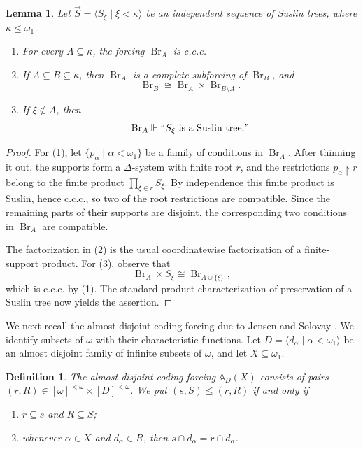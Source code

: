 \documentclass[a4paper,11pt]{article}
\newtheorem{lemma}[theorem]{Lemma}
\newtheorem{definition}[theorem]{Definition}
\begin{document}
\begin{lemma}\label{finite-support-branch-products}
Let $\vec S=\langle S_\xi\mid\xi<\kappa\rangle$ be an independent sequence of
Suslin trees, where $\kappa\leq\omega_1$.
\begin{enumerate}
\item For every $A\subseteq\kappa$, the forcing $\operatorname{Br}_A$ is c.c.c.
\item If $A\subseteq B\subseteq\kappa$, then $\operatorname{Br}_A$ is a
      complete subforcing of $\operatorname{Br}_B$, and
      \[
         \operatorname{Br}_B\cong
         \operatorname{Br}_A\times\operatorname{Br}_{B\setminus A}.
      \]
\item If $\xi\notin A$, then
      \[
         \operatorname{Br}_A\Vdash ``S_\xi\text{ is a Suslin tree}."
      \]
\end{enumerate}
\end{lemma}

\begin{proof}
For (1), let $\{p_\alpha\mid\alpha<\omega_1\}$ be a family of conditions in
$\operatorname{Br}_A$.  After thinning it out, the supports form a
$\Delta$-system with finite root $r$, and the restrictions
$p_\alpha\upharpoonright r$ belong to the finite product
$\prod_{\xi\in r}S_\xi$.  By independence this finite product is Suslin, hence
c.c.c., so two of the root restrictions are compatible.  Since the remaining
parts of their supports are disjoint, the corresponding two conditions in
$\operatorname{Br}_A$ are compatible.

The factorization in (2) is the usual coordinatewise factorization of a
finite-support product.  For (3), observe that
\[
   \operatorname{Br}_A\times S_\xi
   \cong \operatorname{Br}_{A\cup\{\xi\}},
\]
which is c.c.c. by (1).  The standard product characterization of preservation
of a Suslin tree now yields the assertion.
\end{proof}

We next recall the almost disjoint coding forcing due to Jensen and Solovay \cite{JensenSolovay}.
We identify subsets of $\omega$ with their characteristic functions.  Let
$D=\langle d_\alpha\mid\alpha<\omega_1\rangle$ be an almost disjoint family of
infinite subsets of $\omega$, and let $X\subseteq\omega_1$.

\begin{definition}\label{definitionadcoding}
The almost disjoint coding forcing $\mathbb A_D(X)$ consists of pairs
$(r,R)\in[\omega]^{<\omega}\times[D]^{<\omega}$.  We put
$(s,S)\leq(r,R)$ if and only if
\begin{enumerate}
\item $r\subseteq s$ and $R\subseteq S$;
\item whenever $\alpha\in X$ and $d_\alpha\in R$, then
      $s\cap d_\alpha=r\cap d_\alpha$.
\end{enumerate}
\end{definition}
\end{document}
